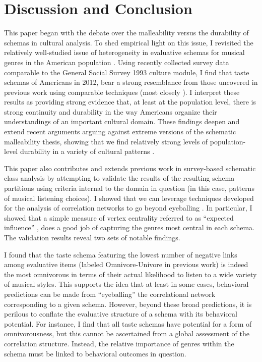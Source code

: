 \documentclass[preprint, authoryear,11pt, 3p]{elsarticle}
\begin{document}
\section{Discussion and Conclusion}
This paper began with the debate over the malleability versus the durability of schemas in cultural analysis. To shed empirical light on this issue, I revisited the relatively well-studied issue of heterogeneity in evaluative schemas for musical genres in the American population \citep{goldberg2011mapping}. Using recently collected survey data comparable to the General Social Survey 1993 culture module, I find that taste schemas of Americans in 2012, bear a strong resemblance from those uncovered in previous work using comparable techniques (most closely \citet{boutyline2017improving}). I interpret these results as providing strong evidence that, at least at the population level, there is strong continuity and durability in the way Americans organize their understandings of an important cultural domain. These findings deepen and extend recent arguments arguing against extreme versions of the schematic malleability thesis, showing that we find relatively strong levels of population-level durability in a variety of cultural patterns \citep{vaisey2016cultural}.

This paper also contributes and extends previous work in survey-based schematic class analysis by attempting to validate the results of the resulting schema partitions using criteria internal to the domain in question (in this case, patterns of musical listening choices). I showed that we can leverage techniques developed for the analysis of correlation networks to go beyond eyeballing \citep{epskamp2012qgraph,networktools}. In particular, I showed that a simple measure of vertex centrality referred to as ``expected influence'' \citep{robinaugh2016identifying}, does a good job of capturing the genres most central in each schema. The validation results reveal two sets of notable findings. 

I found that the taste schema featuring the lowest number of negative links among evaluative items (labeled Omnivore-Univore in previous work) is indeed the most omnivorous in terms of their actual likelihood to listen to a wide variety of musical styles. This supports the idea that at least in some cases, behavioral predictions can be made from ``eyeballing'' the correlational network corresponding to a given schema. However, beyond these broad predictions, it is perilous to conflate the evaluative structure of a schema with its behavioral potential. For instance, I find that all taste schemas have potential for a form of omnivorousness, but this cannot be ascertained from a global assessment of the correlation structure. Instead, the relative importance of genres within the schema must be linked to behavioral outcomes in question. 
\end{document}
